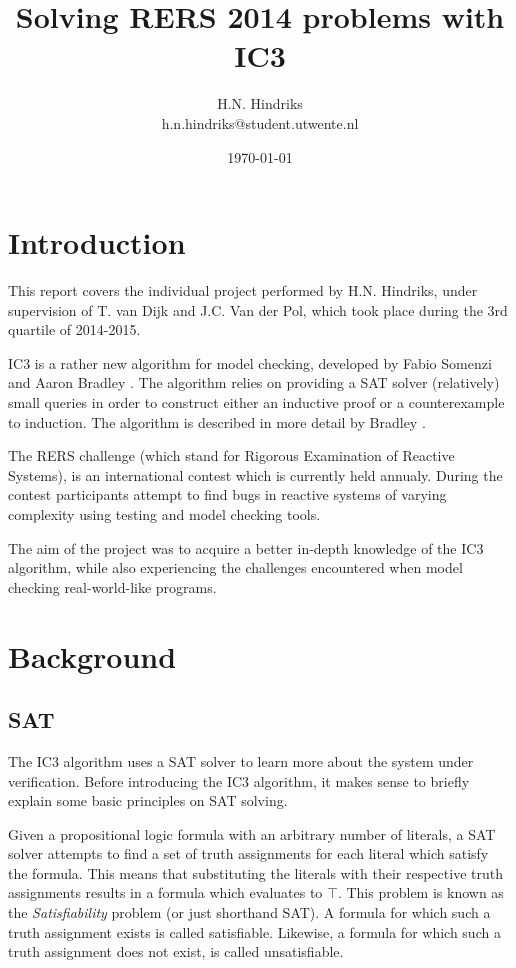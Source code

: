 \documentclass[a4paper]{article}
\begin{document}
\title{Solving RERS 2014 problems with IC3}
\author{H.N. Hindriks\\h.n.hindriks@student.utwente.nl}
\date{\today}
\maketitle

\section{Introduction}
This report covers the individual project performed by H.N. Hindriks, under supervision of T. van Dijk and J.C. Van der Pol, which took place during the 3rd quartile of 2014-2015.

IC3 is a rather new algorithm for model checking, developed by Fabio Somenzi and Aaron Bradley \cite{Bradley2007}. The algorithm relies on providing a SAT solver (relatively) small queries in order to construct either an inductive proof or a counterexample to induction. The algorithm is described in more detail by Bradley \cite{Bradley2011}.

The RERS challenge (which stand for Rigorous Examination of Reactive Systems), is an international contest which is currently held annualy. During the contest participants attempt to find bugs in reactive systems of varying complexity using testing and model checking tools.

The aim of the project was to acquire a better in-depth knowledge of the IC3 algorithm, while also experiencing the challenges encountered when model checking real-world-like programs.

\section{Background}
\subsection{SAT}
The IC3 algorithm uses a SAT solver to learn more about the system under verification. Before introducing the IC3 algorithm, it makes sense to briefly explain some basic principles on SAT solving.

Given a propositional logic formula with an arbitrary number of literals, a SAT solver attempts to find a set of truth assignments for each literal which satisfy the formula. This means that substituting the literals with their respective truth assignments results in a formula which evaluates to $\top$.
This problem is known as the \emph{Satisfiability} problem (or just shorthand SAT). A formula for which such a truth assignment exists is called satisfiable. Likewise, a formula for which such a truth assignment does not exist, is called unsatisfiable.
\end{document}
